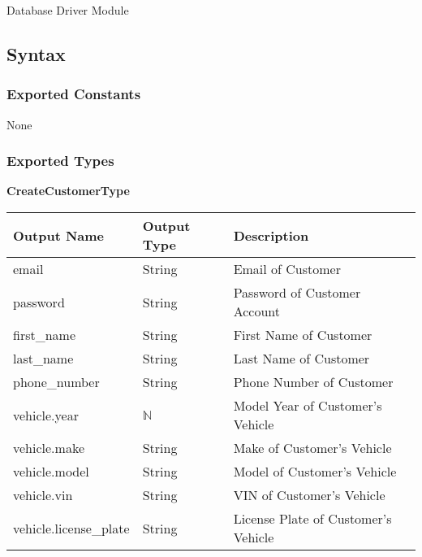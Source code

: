 \documentclass[12pt, titlepage]{article}
\begin{document}
Database Driver Module

\subsection{Syntax}

\subsubsection{Exported Constants}

None

\subsubsection{Exported Types}

\textbf{CreateCustomerType}

\begin{table}[H]
	\begin{tabular}{|l|l|l|}
		\hline
		\textbf{Output Name}   & \textbf{Output Type} & \textbf{Description}                \\
		\hline
		email                  & String               & Email of Customer                   \\
		\hline
		password               & String               & Password of Customer Account        \\
		\hline
		first\_name            & String               & First Name of Customer              \\
		\hline
		last\_name             & String               & Last Name of Customer               \\
		\hline
		phone\_number          & String               & Phone Number of Customer            \\
		\hline
		vehicle.year           & $\mathbb{N}$         & Model Year of Customer's Vehicle    \\
		\hline
		vehicle.make           & String               & Make of Customer's Vehicle          \\
		\hline
		vehicle.model          & String               & Model of Customer's Vehicle         \\
		\hline
		vehicle.vin            & String               & VIN of Customer's Vehicle           \\
		\hline
		vehicle.license\_plate & String               & License Plate of Customer's Vehicle \\
		\hline
	\end{tabular}
\end{table}
\end{document}
